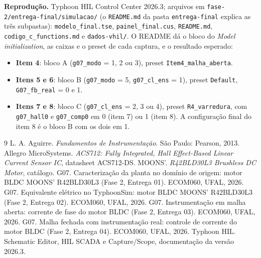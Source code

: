 \documentclass[10pt,a4paper]{article}
\begin{document}
\textbf{Reprodução.} Typhoon HIL Control Center 2026.3; arquivos em \texttt{fase-2/entrega-final/simulacao/} (o \texttt{README.md} da pasta \texttt{entrega-final} explica as três subpastas): \texttt{modelo\_final.tse}, \texttt{painel\_final.cus}, \texttt{README.md}, \texttt{codigo\_c\_functions.md} e \texttt{dados-vhil/}. O README dá o bloco do \emph{Model initialization}, as caixas e o preset de cada captura, e o resultado esperado:
\begin{itemize}
\item \textbf{Item 4}: bloco A (\texttt{g07\_modo} = 1, 2 ou 3), preset \texttt{Item4\_malha\_aberta}.
\item \textbf{Itens 5 e 6}: bloco B (\texttt{g07\_modo} = 5, \texttt{g07\_cl\_ens} = 1), preset \texttt{Default}, \texttt{G07\_fb\_real} = 0 e 1.
\item \textbf{Itens 7 e 8}: bloco C (\texttt{g07\_cl\_ens} = 2, 3 ou 4), preset \texttt{R4\_varredura}, com \texttt{g07\_hall0} e \texttt{g07\_comp0} em 0 (item 7) ou 1 (item 8). A configuração final do item 8 é o bloco B com os dois em 1.
\end{itemize}

\begin{thebibliography}{9}\small
{} L. A. Aguirre. \emph{Fundamentos de Instrumentação}. São Paulo: Pearson, 2013.
 Allegro MicroSystems. \emph{ACS712: Fully Integrated, Hall Effect-Based Linear Current Sensor IC}, datasheet ACS712-DS.
 MOONS'. \emph{R42BLD30L3 Brushless DC Motor}, catálogo.
 G07. Caracterização da planta no domínio de origem: motor BLDC MOONS' R42BLD30L3 (Fase 2, Entrega 01). ECOM060, UFAL, 2026.
 G07. Equivalente elétrico no TyphoonSim: motor BLDC MOONS' R42BLD30L3 (Fase 2, Entrega 02). ECOM060, UFAL, 2026.
 G07. Instrumentação em malha aberta: corrente de fase do motor BLDC (Fase 2, Entrega 03). ECOM060, UFAL, 2026.
 G07. Malha fechada com instrumentação real: controle de corrente do motor BLDC (Fase 2, Entrega 04). ECOM060, UFAL, 2026.
 Typhoon HIL. Schematic Editor, HIL SCADA e Capture/Scope, documentação da versão 2026.3.
\end{thebibliography}
\end{document}
